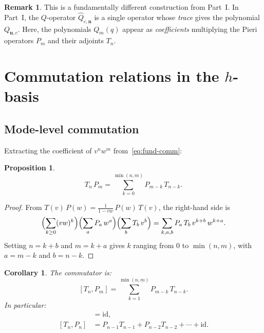 \documentclass[11pt]{article}
\theoremstyle{plain}
\newtheorem{proposition}[theorem]{Proposition}
\newtheorem{corollary}[theorem]{Corollary}
\theoremstyle{definition}
\newtheorem{remark}[theorem]{Remark}
\begin{document}
\begin{remark}
This is a fundamentally different construction from
Part~I.  In Part~I, the $Q$-operator $\hat{Q}_{c,\mathbf{n}}$
is a single operator whose \emph{trace} gives the polynomial
$Q_{\mathbf{n},c}$.  Here, the polynomials $Q_m(q)$ appear as
\emph{coefficients} multiplying the Pieri operators $P_m$ and their
adjoints $T_n$.
\end{remark}


\section{Commutation relations in the $h$-basis}
\label{sec:h-comm}

\subsection{Mode-level commutation}

Extracting the coefficient of $v^n w^m$ from~\eqref{eq:fund-comm}:

\begin{proposition}\label{prop:TnPm}
\begin{equation}\label{eq:TnPm}
  T_n\, P_m = \sum_{k=0}^{\min(n,m)} P_{m-k}\, T_{n-k}.
\end{equation}
\end{proposition}

\begin{proof}
From $T(v)\, P(w) = \frac{1}{1-vw}\, P(w)\, T(v)$, the right-hand
side is
\[
  \Bigl(\sum_{k \geq 0} (vw)^k\Bigr)
  \Bigl(\sum_a P_a\, w^a\Bigr)
  \Bigl(\sum_b T_b\, v^b\Bigr)
  = \sum_{k,a,b} P_a\, T_b\, v^{k+b}\, w^{k+a}.
\]
Setting $n = k + b$ and $m = k + a$ gives $k$ ranging from $0$
to $\min(n,m)$, with $a = m - k$ and $b = n - k$.
\end{proof}

\begin{corollary}\label{cor:commutator}
The commutator is:
\begin{equation}\label{eq:comm-TnPm}
  [T_n, P_m] = \sum_{k=1}^{\min(n,m)} P_{m-k}\, T_{n-k}.
\end{equation}
In particular:
\begin{align}
  [T_1, P_1] &= \mathrm{id},  \label{eq:T1P1} \\
  [T_n, P_n] &= P_{n-1} T_{n-1} + P_{n-2} T_{n-2}
    + \cdots + \mathrm{id}.  \label{eq:TnPn}
\end{align}
\end{corollary}
\end{document}
